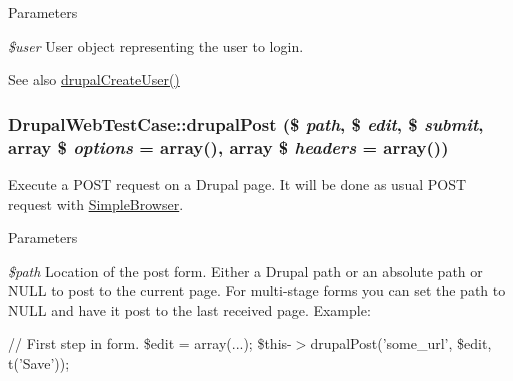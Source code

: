 \begin{DoxyParams}{Parameters}
\item[{\em \$user}]User object representing the user to login.\end{DoxyParams}
\begin{DoxySeeAlso}{See also}
\hyperlink{class_drupal_web_test_case_ad39222df2e8243c419d465bbe48b0713}{drupalCreateUser()} 
\end{DoxySeeAlso}
\hypertarget{class_drupal_web_test_case_aa773e6bf6ff8d0085dc60fb6d9ba888e}{
\subsubsection[{drupalPost}]{\setlength{\rightskip}{0pt plus 5cm}DrupalWebTestCase::drupalPost (\$ {\em path}, \/  \$ {\em edit}, \/  \$ {\em submit}, \/  array \$ {\em options} = {\ttfamily array()}, \/  array \$ {\em headers} = {\ttfamily array()})}}
\label{class_drupal_web_test_case_aa773e6bf6ff8d0085dc60fb6d9ba888e}
Execute a POST request on a Drupal page. It will be done as usual POST request with \hyperlink{class_simple_browser}{SimpleBrowser}.


\begin{DoxyParams}{Parameters}
\item[{\em \$path}]Location of the post form. Either a Drupal path or an absolute path or NULL to post to the current page. For multi-\/stage forms you can set the path to NULL and have it post to the last received page. Example:\end{DoxyParams}
// First step in form. \$edit = array(...); \$this-\/$>$drupalPost('some\_\-url', \$edit, t('Save'));

